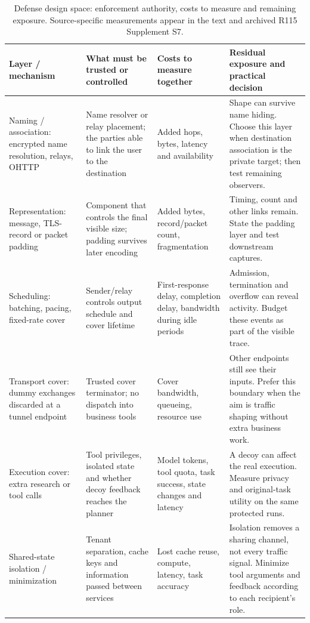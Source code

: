 \begin{table}[t]\centering\small
\caption{Defense design space: enforcement authority, costs to measure and remaining exposure. Source-specific measurements appear in the text and archived R115 Supplement S7.}
\label{tab:defense-space}
\setlength{\tabcolsep}{4pt}
\begin{tabularx}{\textwidth}{@{}P{.17\textwidth}P{.25\textwidth}P{.23\textwidth}Y@{}}\toprule
Layer / mechanism & What must be trusted or controlled & Costs to measure together & Residual exposure and practical decision \\\midrule
Naming / association: encrypted name resolution, relays, OHTTP & Name resolver or relay placement; the parties able to link the user to the destination & Added hops, bytes, latency and availability & Shape can survive name hiding. Choose this layer when destination association is the private target; then test remaining observers. \\\addlinespace[3pt]
Representation: message, TLS-record or packet padding & Component that controls the final visible size; padding survives later encoding & Added bytes, record/packet count, fragmentation & Timing, count and other links remain. State the padding layer and test downstream captures. \\\addlinespace[3pt]
Scheduling: batching, pacing, fixed-rate cover & Sender/relay controls output schedule and cover lifetime & First-response delay, completion delay, bandwidth during idle periods & Admission, termination and overflow can reveal activity. Budget these events as part of the visible trace. \\\addlinespace[3pt]
Transport cover: dummy exchanges discarded at a tunnel endpoint & Trusted cover terminator; no dispatch into business tools & Cover bandwidth, queueing, resource use & Other endpoints still see their inputs. Prefer this boundary when the aim is traffic shaping without extra business work. \\\addlinespace[3pt]
Execution cover: extra research or tool calls & Tool privileges, isolated state and whether decoy feedback reaches the planner & Model tokens, tool quota, task success, state changes and latency & A decoy can affect the real execution. Measure privacy and original-task utility on the same protected runs. \\\addlinespace[3pt]
Shared-state isolation / minimization & Tenant separation, cache keys and information passed between services & Lost cache reuse, compute, latency, task accuracy & Isolation removes a sharing channel, not every traffic signal. Minimize tool arguments and feedback according to each recipient's role. \\\bottomrule
\end{tabularx}
\end{table}

